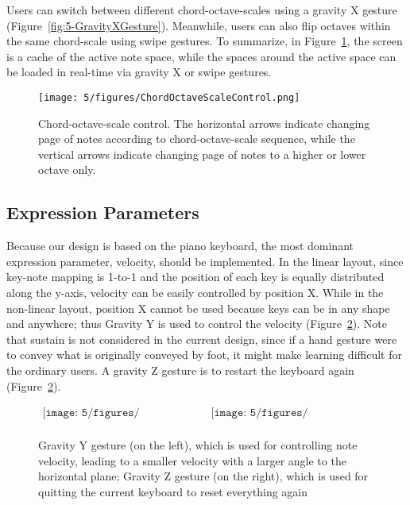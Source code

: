 Users can switch between different chord-octave-scales using a gravity X gesture (Figure~\ref{fig:5-GravityXGesture}). Meanwhile, users can also flip octaves within the same chord-scale using swipe gestures. To summarize, in Figure~\ref{figChordOctaveScaleControl}, the screen is a cache of the active note space, while the spaces around the active space can be loaded in real-time via gravity X or swipe gestures.

\begin{figure}[htbp]
\centering
\texttt{[image: 5/figures/ChordOctaveScaleControl.png]}
\caption{Chord-octave-scale control. The horizontal arrows indicate changing page of notes according to chord-octave-scale sequence, while the vertical arrows indicate changing page of notes to a higher or lower octave only.}
\label{figChordOctaveScaleControl}
\end{figure}

\subsection{Expression Parameters}
Because our design is based on the piano keyboard, the most dominant expression parameter, velocity, should be implemented. In the
linear layout, since key-note mapping is 1-to-1 and the position of each key is equally distributed along the y-axis, velocity can be easily controlled by position X. While in the non-linear layout, position X cannot be used because keys can be in any shape and anywhere; thus Gravity Y is used to control the velocity (Figure~\ref{fig:5-GravityYZGesture}). Note that sustain is not considered in the current design, since if a hand gesture were to convey what is originally conveyed by foot, it might make learning difficult for the ordinary users. A gravity Z gesture is to restart the keyboard again (Figure~\ref{fig:5-GravityYZGesture}).
\begin{figure}[htbp]
\begin{center}$
\begin{array}{cc}
\texttt{[image: 5/figures/GravityY.jpg]} &
\texttt{[image: 5/figures/GravityZ.jpg]} \\
\end{array}$
\end{center}
\caption{Gravity Y gesture (on the left), which is used for controlling note velocity, leading to a smaller velocity with a larger angle to the horizontal plane; Gravity Z gesture (on the right), which is used for quitting the current keyboard to reset everything again}
\label{fig:5-GravityYZGesture}
\end{figure}

